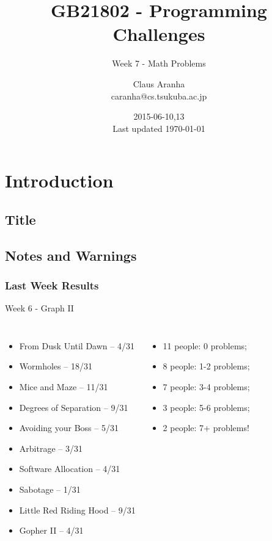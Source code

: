 \documentclass{beamer}
\title[GB21802]{GB21802 - Programming Challenges}
\subtitle[]{Week 7 - Math Problems}
\author[Claus Aranha]{Claus Aranha\\{\footnotesize caranha@cs.tsukuba.ac.jp}}
\institute{College of Information Science}
\date{2015-06-10,13\\{\tiny Last updated \today}}
\begin{document}
\section{Introduction}
\subsection{Title}
\begin{frame}
\maketitle
\end{frame}

\subsection{Notes and Warnings}

\begin{frame}
  \frametitle{Last Week Results}
  \begin{block}{Week 6 - Graph II}
    {\smaller
      \begin{columns}[T]
        \begin{itemize}
        \item From Dusk Until Dawn -- 4/31
        \item Wormholes -- 18/31
        \item Mice and Maze -- 11/31
        \item Degrees of Separation -- 9/31
        \item Avoiding your Boss -- 5/31
        \item Arbitrage -- 3/31
        \item Software Allocation -- 4/31
        \item Sabotage -- 1/31
        \item Little Red Riding Hood -- 9/31
        \item Gopher II -- 4/31
        \end{itemize}
        \begin{itemize}
        \item 11 people: 0 problems;
        \item 8 people: 1-2 problems;
        \item 7 people: 3-4 problems;
        \item 3 people: 5-6 problems;
        \item 2 people: 7+ problems!
        \end{itemize}
      \end{columns}
    }
  \end{block}
\end{frame}
\end{document}
